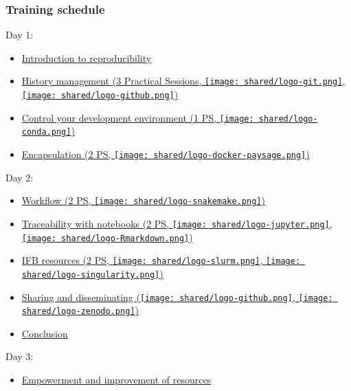 \documentclass{beamer}
\begin{document}
\begin{frame}
\frametitle{Training schedule}
Day 1:
\begin{itemize}
    \item \hyperlink{Introduction}{Introduction to reproducibility}
    \item \hyperlink{History_management}{History management (3 Practical Sessions,             \texttt{[image: shared/logo-git.png]}, \texttt{[image: shared/logo-github.png]})}
    \item \hyperlink{Software_environment}{Control your development environment (1 PS, \texttt{[image: shared/logo-conda.png]})}
    \item \hyperlink{Encapsulation}{Encapsulation (2 PS, \texttt{[image: shared/logo-docker-paysage.png]})}
\end{itemize}
Day 2:
\begin{itemize}
   \item \hyperlink{Workflow}{Workflow (2 PS, \texttt{[image: shared/logo-snakemake.png]})}
   \item \hyperlink{Notebooks}{Traceability with notebooks (2 PS, \texttt{[image: shared/logo-jupyter.png]}, \texttt{[image: shared/logo-Rmarkdown.png]})}
   \item \hyperlink{IFB}{IFB resources (2 PS,
   \texttt{[image: shared/logo-slurm.png]},
   \texttt{[image: shared/logo-singularity.png]})}
   \item \hyperlink{Sharing}{Sharing and disseminating (\texttt{[image: shared/logo-github.png]}, \texttt{[image: shared/logo-zenodo.png]})}
   \item \hyperlink{Conclusion}{Conclusion}
\end{itemize}
Day 3: 
\begin{itemize}
    \item \hyperlink{Improvement}{Empowerment and improvement of resources}
\end{itemize}
\end{frame}
\label{Introduction}
\end{document}
